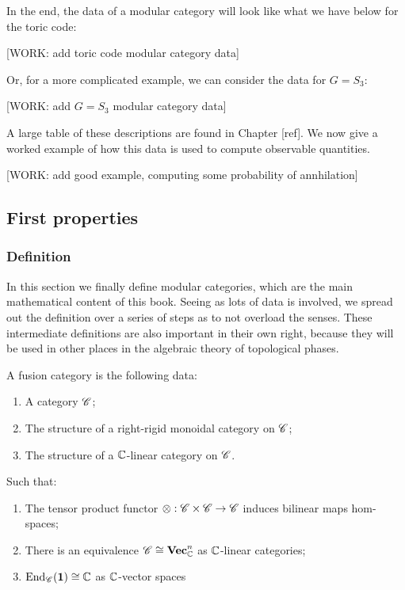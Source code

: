 In the end, the data of a modular category will look like what we have below for the toric code:

[WORK: add toric code modular category data]

Or, for a more complicated example, we can consider the data for $G=S_3$:

[WORK: add $G=S_3$ modular category data]

A large table of these descriptions are found in Chapter [ref]. We now give a worked example of how this data is used to compute observable quantities.

[WORK: add good example, computing some probability of annhilation]

\subsection{First properties}

\subsubsection{Definition}

In this section we finally define modular categories, which are the main mathematical content of this book. Seeing as lots of data is involved, we spread out the definition over a series of steps as to not overload the senses. These intermediate definitions are also important in their own right, because they will be used in other places in the algebraic theory of topological phases.


\begin{definition} A fusion category is the following data:

\begin{enumerate}
\item A category $\mathscr{C}$;
\item The structure of a right-rigid monoidal category on $\mathscr{C}$;
\item The structure of a $\mathbb{C}$-linear category on $\mathscr{C}$.
\end{enumerate}

Such that:

\begin{enumerate}
\item The tensor product functor $\otimes: \mathscr{C}\times \mathscr{C}\to \mathscr{C}$ induces bilinear maps hom-spaces;
\item There is an equivalence $\mathscr{C} \cong \mathbf{Vec}_{\mathbb{C}}^n$ as $\mathbb{C}$-linear categories;
\item $\operatorname{End}_{\mathscr{C}}(\mathbf{1})\cong \mathbb{C}$ as $\mathbb{C}$-vector spaces
\end{enumerate}

\raggedleft\qedsymbol{}
\end{definition}

